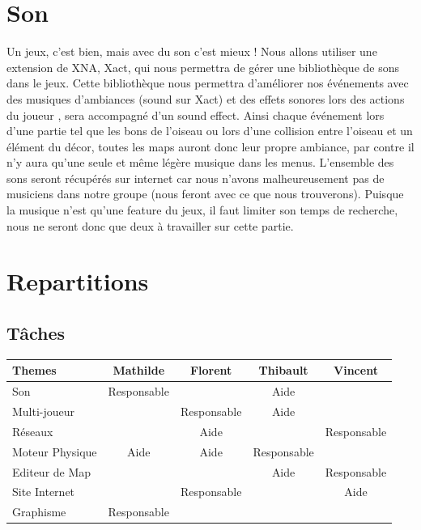 \documentclass [11pt]{report}
\begin{document}
	\section {Son}
		Un jeux, c'est bien, mais avec du son c'est mieux ! Nous allons utiliser une extension de XNA, Xact, qui nous permettra de g\'erer une biblioth\`eque de sons dans le jeux. Cette biblioth\`eque nous permettra d'am\'eliorer nos \'ev\'enements avec des musiques d'ambiances (sound sur Xact) et des effets sonores lors des actions du 		joueur , sera accompagné d'un sound effect. Ainsi chaque événement lors d'une partie tel que les bons de l'oiseau ou lors d'une collision entre l'oiseau et un élément du décor, toutes les maps auront donc leur propre ambiance, par contre il n'y aura qu'une seule et même légère musique dans les menus. L'ensemble des sons seront récupérés sur internet car nous n'avons malheureusement pas de musiciens dans notre groupe (nous feront avec ce que nous trouverons). Puisque la musique n'est qu'une feature du jeux, il faut limiter son temps de recherche, nous ne seront donc que deux à travailler sur cette partie.\\\vspace{5mm}

	\section{Repartitions}
		\subsection{Tâches}
			\begin{tabular}{| l |*{4} {c|}}
				\hline
				Themes          & Mathilde    & Florent     & Thibault    & Vincent \\
				\hline
				Son             & Responsable &             & Aide        &          \\
				\hline
				Multi-joueur    &             & Responsable & Aide        &          \\
				\hline
				Réseaux         &             & Aide        &             & Responsable     \\
				\hline
				Moteur Physique & Aide        & Aide        & Responsable &           \\
				\hline
				Editeur de Map &              &             & Aide        &  Responsable\\
				\hline
				Site Internet  &              & Responsable &             &  Aide       \\
				\hline
				Graphisme      & Responsable  &             &             &\\
				\hline
				
			\end{tabular}\\\vspace{3mm}
\end{document}
